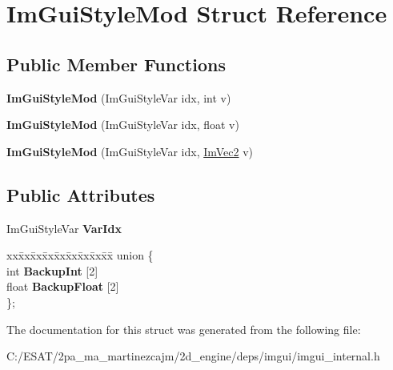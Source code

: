 \hypertarget{struct_im_gui_style_mod}{}\section{Im\+Gui\+Style\+Mod Struct Reference}
\label{struct_im_gui_style_mod}
\subsection*{Public Member Functions}
\begin{DoxyCompactItemize}
\item 
\mbox{\label{struct_im_gui_style_mod_ae9987273b247f021020034256364bec8}} 
{\bfseries Im\+Gui\+Style\+Mod} (Im\+Gui\+Style\+Var idx, int v)
\item 
\mbox{\label{struct_im_gui_style_mod_a737c3fad802a8d5d4616f9decc7e402d}} 
{\bfseries Im\+Gui\+Style\+Mod} (Im\+Gui\+Style\+Var idx, float v)
\item 
\mbox{\label{struct_im_gui_style_mod_a28647cc4ab8b95b8ee30e0fc7401ae07}} 
{\bfseries Im\+Gui\+Style\+Mod} (Im\+Gui\+Style\+Var idx, \hyperlink{struct_im_vec2}{Im\+Vec2} v)
\end{DoxyCompactItemize}
\subsection*{Public Attributes}
\begin{DoxyCompactItemize}
\item 
\mbox{\label{struct_im_gui_style_mod_ab23c55941dbd0e156ce640a8fecb2feb}} 
Im\+Gui\+Style\+Var {\bfseries Var\+Idx}
\item 
\mbox{\label{struct_im_gui_style_mod_a66d9f827b3838201efe538bed0b68d52}} 
\begin{tabbing}
xx\=xx\=xx\=xx\=xx\=xx\=xx\=xx\=xx\=\kill
union \{\\
\>int {\bfseries BackupInt} \mbox{[}2\mbox{]}\\
\>float {\bfseries BackupFloat} \mbox{[}2\mbox{]}\\
\}; \\

\end{tabbing}\end{DoxyCompactItemize}


The documentation for this struct was generated from the following file\+:\begin{DoxyCompactItemize}
\item 
C\+:/\+E\+S\+A\+T/2pa\+\_\+ma\+\_\+martinezcajm/2d\+\_\+engine/deps/imgui/imgui\+\_\+internal.\+h\end{DoxyCompactItemize}
